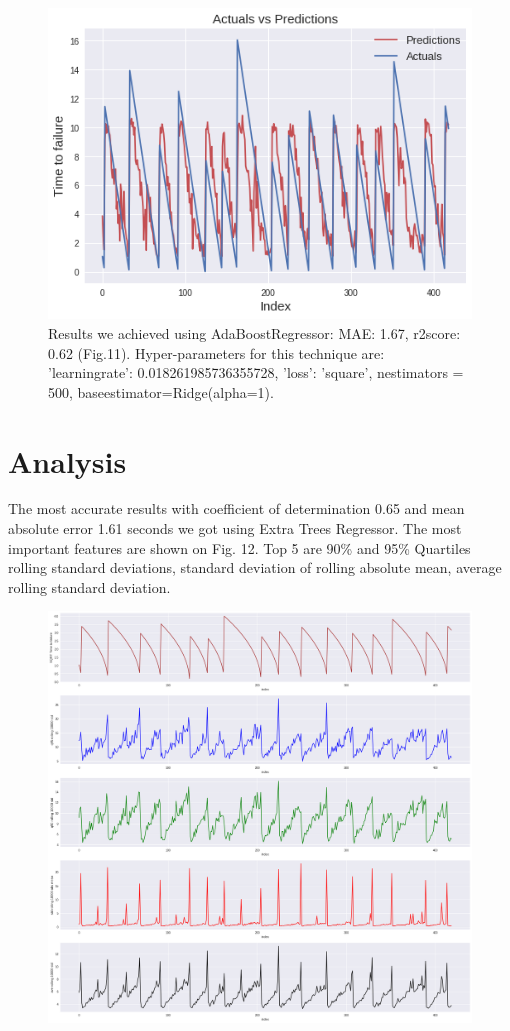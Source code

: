 \documentclass[]{llncs} %
\begin{document}
\begin{figure}[H]
	\centering
	\includegraphics[width=.9\linewidth]{results2}
	\caption{Results we achieved using AdaBoostRegressor: MAE: 1.67, r2score: 0.62 (Fig.11).
		Hyper-parameters for this technique are: 'learningrate': 0.018261985736355728, 'loss': 'square', nestimators = 500, baseestimator=Ridge(alpha=1).}
	\label{fig:results2}
\end{figure}
\clearpage
\newpage
\section{Analysis}
The most accurate results with coefficient of determination 0.65 and mean absolute error 1.61 seconds we got using Extra Trees Regressor. The most important features are shown on Fig. 12. Top 5 are 90\% and 95\% Quartiles rolling standard deviations, standard deviation of rolling absolute mean, average rolling standard deviation.
\begin{figure}[H]
	\centering
	\includegraphics[width=.9\linewidth]{analysis}
	\caption{}
	\label{fig:analysis}
\end{figure}
\end{document}
